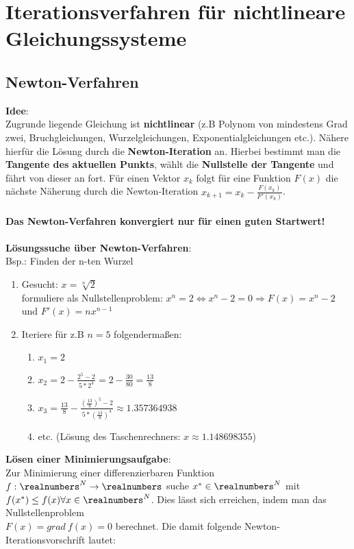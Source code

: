 \section{Iterationsverfahren für nichtlineare Gleichungssysteme}%
\label{itn:sec:iterationsverfahren}
\subsection{Newton-Verfahren}%
\label{itn:sub:newton-verfahren}
\textbf{Idee}:\\Zugrunde liegende Gleichung ist \textbf{nichtlinear} (z.B Polynom von mindestens Grad zwei, Bruchgleichungen, Wurzelgleichungen, Exponentialgleichungen etc.). Nähere hierfür die Lösung durch die \textbf{Newton-Iteration} an. Hierbei bestimmt man die \textbf{Tangente des aktuellen Punkts}, wählt die \textbf{Nullstelle der Tangente} und fährt von dieser an fort. Für einen Vektor $x_k$ folgt für eine Funktion $F(x)$ die nächste Näherung durch die Newton-Iteration $x_{k + 1} = x_k - \frac{F(x_k)}{F'(x_k)}$.\\\\
\textbf{Das Newton-Verfahren konvergiert nur für einen guten Startwert!}\\\\
\textbf{Lösungssuche über Newton-Verfahren}:\\
Bsp.: Finden der n-ten Wurzel
\begin{enumerate}
	\item Gesucht: $x = \sqrt[n]{2}$\\formuliere als Nullstellenproblem: $x^n = 2 \Leftrightarrow x^n - 2 = 0 \Rightarrow F(x) = x^n - 2$ und $F'(x) = nx^{n - 1}$
	\item Iteriere für z.B $n = 5$ folgendermaßen:
	\begin{enumerate}
		\item $x_1 = 2$
		\item $x_2 = 2 - \frac{2^5 - 2}{5 * 2^4} = 2 - \frac{30}{80} = \frac{13}{8}$
		\item $x_3 = \frac{13}{8} - \frac{(\frac{13}{8})^5 - 2}{5 * (\frac{13}{8})^4} \approx 1.357364938$
		\item etc. (Lösung des Taschenrechners: $x \approx 1.148698355$)
	\end{enumerate}
\end{enumerate}
\textbf{Lösen einer Minimierungsaufgabe}:                                                                                        \\
Zur Minimierung einer differenzierbaren Funktion $f: \realnumbers^N \rightarrow \realnumbers$ suche $x^* \in \realnumbers^N$ mit \\$f(x^*) \leq f(x) \forall x \in \realnumbers^N$. Dies lässt sich erreichen, indem man das Nullstellenproblem\\$F(x) = grad\ f(x) = 0$ berechnet. Die damit folgende Newton-Iterationsvorschrift lautet:
